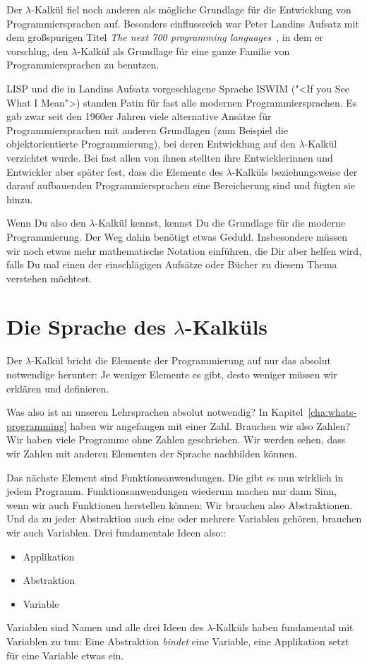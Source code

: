 Der $\lambda$-Kalkül fiel noch anderen als mögliche Grundlage für die
Entwicklung von Programmiersprachen auf.  Besonders einflussreich war
Peter Landins Aufsatz mit dem großspurigen Titel \textit{The next 700
  programming languages}~\cite{Landin1966}, in dem er vorschlug, den
$\lambda$-Kalkül als Grundlage für eine ganze Familie von
Programmiersprachen zu benutzen.

LISP und die in Landins Aufsatz vorgeschlagene Sprache ISWIM ("<If you
See What I Mean">) standen Patin für fast alle modernen
Programmiersprachen.  Es gab zwar seit den 1960er Jahren viele
alternative Ansätze für Programmiersprachen mit anderen Grundlagen
(zum Beispiel die objektorientierte Programmierung), bei deren
Entwicklung auf den $\lambda$-Kalkül verzichtet wurde.  Bei fast allen
von ihnen stellten ihre Entwicklerinnen und Entwickler aber später
fest, dass die Elemente des $\lambda$-Kalküls beziehungsweise der
darauf aufbauenden Programmiersprachen eine Bereicherung sind und
fügten sie hinzu.

Wenn Du also den $\lambda$-Kalkül kennst, kennst Du die Grundlage für
die moderne Programmierung.  Der Weg dahin benötigt etwas Geduld.
Insbesondere müssen wir noch etwas mehr mathematische Notation
einführen, die Dir aber helfen wird, falls Du mal einen der
einschlägigen Aufsätze oder Bücher zu diesem Thema verstehen möchtest.

\section{Die Sprache des $\lambda$-Kalküls}
\label{sec:sprache}

Der $\lambda$-Kalkül bricht die Elemente der Programmierung auf nur
das absolut notwendige herunter: Je weniger Elemente es gibt, desto
weniger müssen wir erklären und definieren.

Was also ist an unseren Lehrsprachen absolut notwendig?  In
Kapitel~\ref{cha:whats-programming} haben wir angefangen mit einer
Zahl.  Brauchen wir also Zahlen?  Wir haben viele Programme ohne
Zahlen geschrieben.  Wir werden sehen, dass wir
Zahlen mit anderen Elementen der Sprache nachbilden können.

Das nächste Element sind Funktionsanwendungen.  Die gibt es nun
wirklich in jedem Programm.  Funktionsanwendungen wiederum machen nur
dann Sinn, wenn wir auch Funktionen herstellen können: Wir brauchen
also Abstraktionen.  Und da zu jeder Abstraktion auch eine oder
mehrere Variablen gehören, brauchen wir auch Variablen.  Drei
fundamentale Ideen also::
%
\begin{itemize}
\item Applikation
\item Abstraktion
\item Variable
\end{itemize}
%
Variablen sind Namen und alle drei Ideen des $\lambda$-Kalküls haben
fundamental mit Variablen zu tun: Eine Abstraktion
\emph{bindet} eine Variable, eine Applikation setzt für eine Variable
etwas ein.

